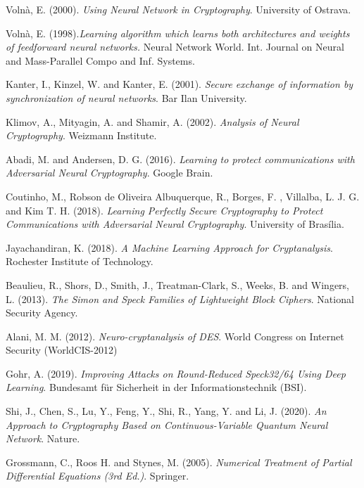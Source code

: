 \documentclass[%
    corpo=11pt,
    twoside,
    stile=classica,
    oldstyle,
    autoretitolo,
    tipotesi=magistrale,
    greek,
    evenboxes,
    english
]{toptesi}
\begin{document}
\begin{thebibliography}{99}
 {\sc Volnà, E.} (2000). \textit{Using Neural Network in Cryptography}. University of Ostrava.

 {\sc Volnà, E.} (1998).\textit{Learning algorithm which learns both architectures and weights of feedforward neural networks.} Neural Network World. Int. Journal on Neural and Mass-Parallel Compo and Inf. Systems.

 {\sc Kanter, I.}, {\sc Kinzel, W.} and {\sc Kanter, E.} (2001). \textit{Secure exchange of information by synchronization of neural networks}. Bar Ilan University.

 {\sc Klimov, A.}, {\sc Mityagin, A.} and {\sc Shamir, A.} (2002). \textit{Analysis of Neural Cryptography}. Weizmann Institute.


 {\sc Abadi, M.} and {\sc Andersen, D. G.} (2016). \textit{Learning to protect communications with Adversarial Neural Cryptography}. Google Brain.

 {\sc Coutinho, M.}, {\sc Robson de Oliveira Albuquerque, R.}, {\sc Borges, F. }, {\sc Villalba, L. J. G.} and  {\sc Kim T. H.} (2018). \textit{Learning Perfectly Secure Cryptography to Protect Communications with Adversarial Neural Cryptography}. University of Brasília.

 {\sc Jayachandiran, K.} (2018). \textit{A Machine Learning Approach for Cryptanalysis}. Rochester Institute of Technology.

 {\sc Beaulieu, R.}, {\sc Shors, D.}, {\sc Smith, J.}, {\sc Treatman-Clark, S.}, {\sc Weeks, B.} and {\sc Wingers, L.} (2013). \textit{The Simon and Speck Families of Lightweight Block Ciphers}. National Security Agency.

 {\sc Alani, M. M.} (2012). \textit{Neuro-cryptanalysis of DES}. World Congress on Internet Security (WorldCIS-2012)

 {\sc Gohr, A.} (2019). \textit{Improving Attacks on Round-Reduced Speck32/64 Using Deep Learning}. Bundesamt für Sicherheit in der Informationstechnik (BSI).

 {\sc Shi, J.}, {\sc Chen, S.}, {\sc Lu, Y.}, {\sc Feng, Y.}, {\sc Shi, R.}, {\sc Yang, Y.} and {\sc Li, J.} (2020). \textit{An Approach to Cryptography Based on Continuous-Variable Quantum Neural Network}. Nature.

 {\sc Grossmann, C.}, {\sc Roos H.} and {\sc Stynes, M.} (2005). \textit{Numerical Treatment of Partial Differential Equations (3rd Ed.)}. Springer.
\end{thebibliography}
\end{document}
